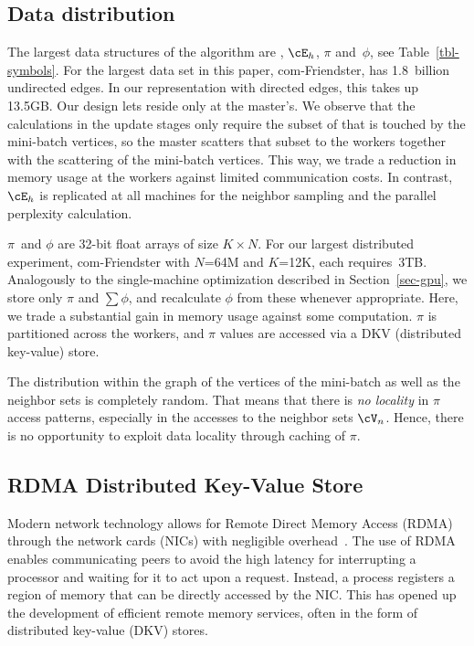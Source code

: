 
\subsection{Data distribution}


The largest data structures of the algorithm are \Edges, $\cE_h$, $\pi$
and~$\phi$, see Table~\ref{tbl-symbols}.
For the largest data set in this paper, com-Friendster, \Edges has 1.8~billion
undirected edges. In our representation with directed edges, this takes
up 13.5GB. Our design lets \Edges reside only at the master's. We observe that
the calculations in the update stages only require the subset of \Edges that
is touched by the mini-batch vertices, so the master scatters that subset to
the workers together with the scattering of the mini-batch vertices. This way,
we trade a reduction in memory usage at the workers against limited
communication costs. In contrast, $\cE_h$ is replicated at
all machines for the neighbor sampling and the parallel perplexity calculation.

$\pi$~and $\phi$ are 32-bit float arrays of size $K \times N$. For our
largest distributed experiment, com-Friendster with $N$=64M and $K$=12K, each
requires~3TB. Analogously to the single-machine optimization described in
Section~\ref{sec-gpu}, we store only $\pi$ and
$\sum\phi$, and recalculate
$\phi$ from these whenever appropriate. Here, we trade a substantial gain
in memory usage against some computation. $\pi$ is partitioned across the workers,
and $\pi$ values are accessed via a DKV (distributed key-value) store.


The distribution within the graph of the vertices of the mini-batch as well as
the neighbor sets is completely random. That means that there is \textit{no
locality}
in $\pi$ access patterns, especially in the accesses to the neighbor sets
$\Neighbors$.
Hence, there is no opportunity to exploit data locality through caching of
$\pi$.

\subsection{RDMA Distributed Key-Value Store}

Modern network technology allows for Remote Direct Memory Access (RDMA)
through the network cards (NICs) with negligible
overhead~\cite{Hamada_infinibandtrade,Beck:2011:PER:2043535.2043537}. The use
of RDMA enables communicating peers to avoid the high latency for
interrupting a processor and waiting for it to act upon a request. Instead, a
process registers a region of memory that can be directly accessed by the
NIC. %
This has opened up the development of
efficient remote memory services, often in the form of distributed key-value
(DKV) stores.

